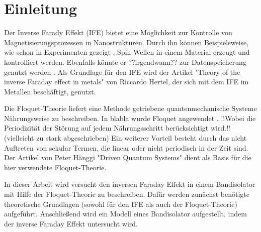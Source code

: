 \chapter{Einleitung}
Der Inverse Farady Effekt (IFE) bietet eine Möglichkeit
zur Kontrolle von Magnetisierungsprozessen in Nanostrukturen.
Durch ihn können Beispielsweise, wie schon in Experimenten gezeigt \cite{E2},
Spin-Wellen in einem Material erzeugt und kontrolliert werden.
Ebenfalls könnte er ??irgendwann?? zur Datenspeicherung genutzt werden \cite{}.
Als Grundlage für den IFE wird der Artikel
"Theory of the inverse Faraday effect
 in metals" \cite{hertel} von Riccardo
Hertel, der sich mit dem IFE im Metallen
beschäftigt, genutzt.

Die Floquet-Theorie liefert eine Methode
getriebene quantenmechanische Systeme
Nährungsweise zu beschreiben.
In blabla wurde Floquet angewendet .
!!Wobei die Periodizität
der Störung auf jedem Nährungsschritt
berücksichtigt wird.!!(vielleicht zu stark abgeschrieben)
Ein weiterer Vorteil besteht
durch das nicht Auftreten von
sekular Termen, die linear oder nicht
periodisch in der Zeit sind.
Der Artikel von Peter Hänggi
"Driven Quantum Systems" \cite{haggi}
dient als Basis für die hier verwendete Floquet-Theorie.


In dieser Arbeit wird versucht
den inversen Faraday Effekt
in einem Bandisolator mit
Hilfe der Floquet-Theorie
zu beschreiben.
Dafür werden zunächst benötigte
theoretische Grundlagen (sowohl für den IFE als auch der Floquet-Theorie) aufgeführt.
Anschließend wird ein Modell eines Bandisolator aufgestellt,
indem der inverse Faraday Effekt untersucht wird.









%
%
%
